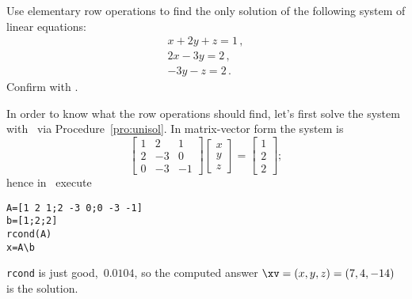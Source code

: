 \begin{example} \label{eg:erowops}
Use elementary row operations to find the only solution of the following system of linear equations:
\begin{equation*}
\begin{array}{l}
x+2y+z=1\,,\\ 2x-3y=2\,,\\ -3y-z=2\,.
\end{array}
\end{equation*}
Confirm with \script.
\begin{solution} 
In order to know what the row operations should find, let's first solve the system with \script\ via Procedure~\ref{pro:unisol}. 
In matrix-vector form the system is
\begin{equation*}
\begin{bmatrix} 1&2&1\\2&-3&0\\0&-3&-1 \end{bmatrix}
\begin{bmatrix} x\\y\\z \end{bmatrix}
=\begin{bmatrix} 1\\2\\2 \end{bmatrix};
\end{equation*}
hence in \script\ execute
\begin{verbatim}
A=[1 2 1;2 -3 0;0 -3 -1]
b=[1;2;2]
rcond(A)
x=A\b
\end{verbatim}
\setbox\ajrqrbox\hbox{}%
\marginpar{\usebox{\ajrqrbox\\[2ex]}}%
\verb|rcond| is just good,~\(0.0104\), so the computed answer \(\xv=(x,y,z)=(7,4,-14)\) is the solution.


\end{solution}
\end{example}
